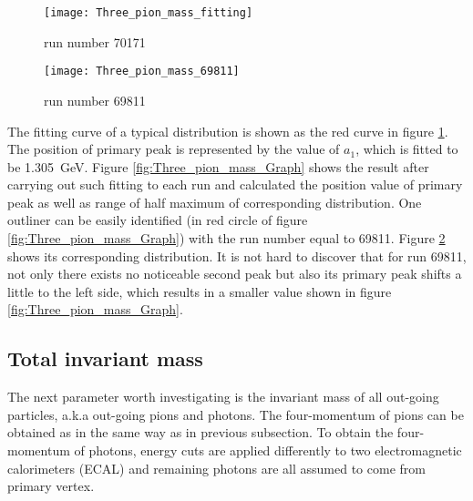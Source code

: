 \begin{figure*}[t!]
	\centering
	\begin{subfigure}{0.48\textwidth}
		\texttt{[image: Three\_pion\_mass\_fitting]}
		\caption{run number 70171}
		\label{fig:Three_pion_mass_fitting}
	\end{subfigure}
	\begin{subfigure}{0.48\textwidth}
		\texttt{[image: Three\_pion\_mass\_69811]}
		\caption{run number 69811}
		\label{fig:Three_pion_mass_69811}
	\end{subfigure}
	\caption{Invariant mass distribution of three pions and their corresponding fitting result. The range of fitting corresponds to \SI{30}{\percent} of maximal value of distribution. (a) Distribution of a normal run. The first peak (primary) locates at around \SI{1.3}{\giga\electronvolt}. The fitting curve (red) coincide well with data around primary peak, but poorly around second peak. (b) Distribution of an abnormal run. No second peak can be found on the right side of primary peak. Parameter $a_1$ is fitted to be \SI{1.034}{\giga\electronvolt}, which is slightly larger than correct value due to the bad fitting coincidence. }
	\label{fig:pion_mass}
\end{figure*}



The fitting curve of a typical distribution is shown as the red curve in figure \ref{fig:Three_pion_mass_fitting}. The position of primary peak is represented by the value of $a_1$, which is fitted to be \SI{1.305}{\giga\electronvolt}. Figure \ref{fig:Three_pion_mass_Graph} shows the result after carrying out such fitting to each run and calculated the position value of primary peak as well as range of half maximum of corresponding distribution. One outliner can be easily identified (in red circle of figure \ref{fig:Three_pion_mass_Graph}) with the run number equal to 69811. Figure \ref{fig:Three_pion_mass_69811} shows its corresponding distribution. It is not hard to discover that for run 69811, not only there exists no noticeable second peak but also its primary peak shifts a little to the left side, which results in a smaller value shown in figure \ref{fig:Three_pion_mass_Graph}.
\subsection{Total invariant mass}
The next parameter worth investigating is the invariant mass of all out-going particles, a.k.a out-going pions and photons. The four-momentum of pions can be obtained as in the same way as in previous subsection. To obtain the four-momentum of photons, energy cuts are applied differently to two electromagnetic calorimeters (ECAL) and remaining photons are all assumed to come from primary vertex.
